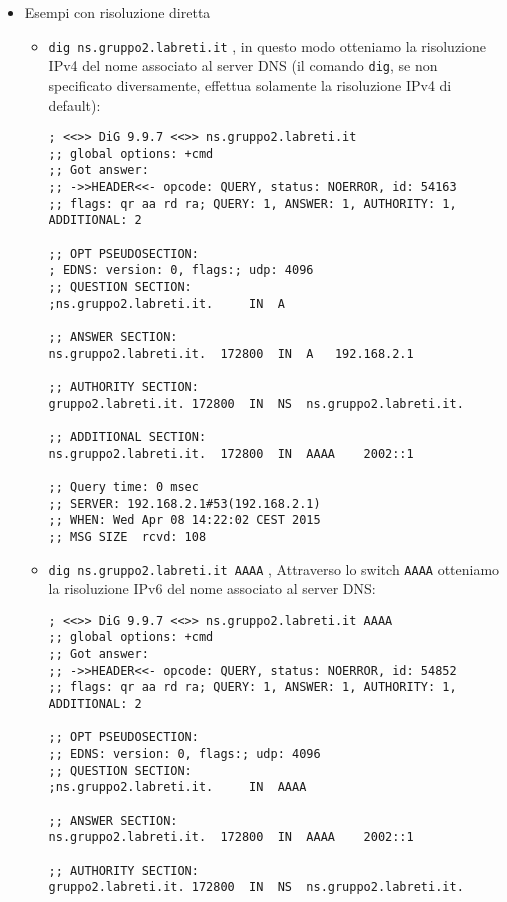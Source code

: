\documentclass[9pt, a4paper, oneside]{article}
\begin{document}
				\begin{itemize}
					\item
						Esempi con risoluzione diretta
						\begin{itemize}
							\item
								\texttt{dig ns.gruppo2.labreti.it} , 
								in questo modo 
								otteniamo la 
								risoluzione 
								IPv4 del nome 
								associato 
								al server DNS 
								(il comando 
								\texttt{dig}, 
								se non 
								specificato 
								diversamente, 
								effettua 
								solamente la 
								risoluzione 
								IPv4 di default):
								\begin{verbatim}
; <<>> DiG 9.9.7 <<>> ns.gruppo2.labreti.it
;; global options: +cmd
;; Got answer:
;; ->>HEADER<<- opcode: QUERY, status: NOERROR, id: 54163
;; flags: qr aa rd ra; QUERY: 1, ANSWER: 1, AUTHORITY: 1, ADDITIONAL: 2

;; OPT PSEUDOSECTION:
; EDNS: version: 0, flags:; udp: 4096
;; QUESTION SECTION:
;ns.gruppo2.labreti.it.		IN	A

;; ANSWER SECTION:
ns.gruppo2.labreti.it.	172800	IN	A	192.168.2.1

;; AUTHORITY SECTION:
gruppo2.labreti.it.	172800	IN	NS	ns.gruppo2.labreti.it.

;; ADDITIONAL SECTION:
ns.gruppo2.labreti.it.	172800	IN	AAAA	2002::1

;; Query time: 0 msec
;; SERVER: 192.168.2.1#53(192.168.2.1)
;; WHEN: Wed Apr 08 14:22:02 CEST 2015
;; MSG SIZE  rcvd: 108
								\end{verbatim}
							\item
								\texttt{dig ns.gruppo2.labreti.it AAAA} , 
								Attraverso lo 
								switch 
								\texttt{AAAA} 
								otteniamo la 
								risoluzione 
								IPv6 del nome 
				 				associato al 
				 				server DNS:
								\begin{verbatim}
; <<>> DiG 9.9.7 <<>> ns.gruppo2.labreti.it AAAA
;; global options: +cmd
;; Got answer:
;; ->>HEADER<<- opcode: QUERY, status: NOERROR, id: 54852
;; flags: qr aa rd ra; QUERY: 1, ANSWER: 1, AUTHORITY: 1, ADDITIONAL: 2

;; OPT PSEUDOSECTION:
;; EDNS: version: 0, flags:; udp: 4096
;; QUESTION SECTION:
;ns.gruppo2.labreti.it.		IN	AAAA

;; ANSWER SECTION:
ns.gruppo2.labreti.it.	172800	IN	AAAA	2002::1

;; AUTHORITY SECTION:
gruppo2.labreti.it.	172800	IN	NS	ns.gruppo2.labreti.it.


\end{verbatim}
\end{itemize}
\end{itemize}
\end{document}
